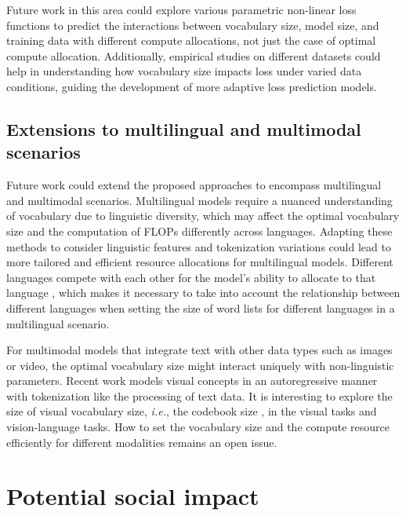 Future work in this area could explore various parametric non-linear loss functions to predict the interactions between vocabulary size, model size, and training data with different compute allocations, not just the case of optimal compute allocation. Additionally, empirical studies on different datasets could help in understanding how vocabulary size impacts loss under varied data conditions, guiding the development of more adaptive loss prediction models.

\subsection{Extensions to multilingual and multimodal scenarios}
Future work could extend the proposed approaches to encompass multilingual and multimodal scenarios. Multilingual models require a nuanced understanding of vocabulary due to linguistic diversity, which may affect the optimal vocabulary size and the computation of FLOPs differently across languages. Adapting these methods to consider linguistic features and tokenization variations could lead to more tailored and efficient resource allocations for multilingual models. Different languages compete with each other for the model's ability to allocate to that language \citep{blevins2024breaking}, which makes it necessary to take into account the relationship between different languages when setting the size of word lists for different languages in a multilingual scenario.

For multimodal models that integrate text with other data types such as images or video, the optimal vocabulary size might interact uniquely with non-linguistic parameters. Recent work \citep{aghajanyan2022cm3,tian2024visual} models visual concepts in an autoregressive manner with tokenization like the processing of text data. It is interesting to explore the size of visual vocabulary size, \textit{i.e.}, the codebook size \citep{esser2021taming}, in the visual tasks and vision-language tasks. How to set the vocabulary size and the compute resource efficiently for different modalities remains an open issue.

\section{Potential social impact}
\label{append:social}

